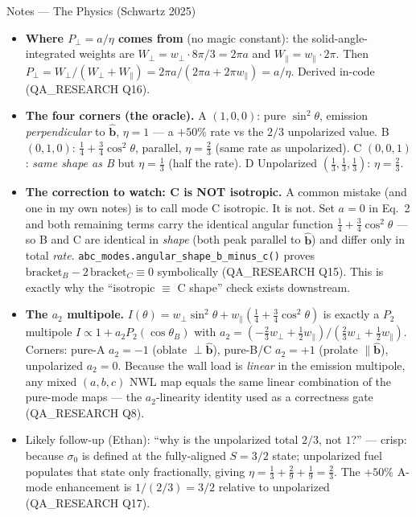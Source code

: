 \documentclass[11pt,aspectratio=169]{beamer}
\newcommand{\bhat}{\hat{\mathbf{b}}}
\begin{document}
\begin{frame}[allowframebreaks]{Notes --- The Physics (Schwartz 2025)}
{\begin{itemize}
      depends only on $(w_\perp,w_\parallel)$, through the selection probability
      $P_\perp = a/\eta$; the overall rate $\eta$ is a separate scalar that multiplies the spatial
      source strength. So A-mode and C-mode emit different \emph{numbers} of neutrons but each
      emits correctly \emph{shaped} directions. This mirrors how Schwartz himself separates angular
      factors from rate factors (QA\_RESEARCH Q18).
\item \textbf{Where $P_\perp=a/\eta$ comes from} (no magic constant): the solid-angle-integrated
      weights are $W_\perp = w_\perp\cdot 8\pi/3 = 2\pi a$ and $W_\parallel = w_\parallel\cdot
      2\pi$. Then $P_\perp = W_\perp/(W_\perp+W_\parallel) = 2\pi a/(2\pi a + 2\pi w_\parallel)
      = a/\eta$. Derived in-code (QA\_RESEARCH Q16).
\item \textbf{The four corners (the oracle).} A $(1,0,0)$: pure $\sin^2\theta$, emission
      \emph{perpendicular} to $\bhat$, $\eta=1$ --- a $+50\%$ rate vs the $2/3$ unpolarized value.
      B $(0,1,0)$: $\tfrac14+\tfrac34\cos^2\theta$, parallel, $\eta=\tfrac23$ (same rate as
      unpolarized). C $(0,0,1)$: \emph{same shape as B} but $\eta=\tfrac13$ (half the rate). D
      Unpolarized $(\tfrac13,\tfrac13,\tfrac13)$: $\eta=\tfrac23$.
\item \textbf{The correction to watch: C is NOT isotropic.} A common mistake (and one in my own
      notes) is to call mode C isotropic. It is not. Set $a=0$ in Eq.\ 2 and both remaining terms
      carry the identical angular function $\tfrac14+\tfrac34\cos^2\theta$ --- so B and C are
      identical in \emph{shape} (both peak parallel to $\bhat$) and differ only in total \emph{rate}.
      \texttt{abc\_modes.angular\_shape\_b\_minus\_c()} proves $\text{bracket}_B - 2\,
      \text{bracket}_C \equiv 0$ symbolically (QA\_RESEARCH Q15). This is exactly why the ``isotropic
      $\equiv$ C shape'' check exists downstream.
\item \textbf{The $a_2$ multipole.} $I(\theta)=w_\perp\sin^2\theta + w_\parallel(\tfrac14+
      \tfrac34\cos^2\theta)$ is exactly a $P_2$ multipole $I\propto 1 + a_2 P_2(\cos\theta_B)$ with
      $a_2 = (-\tfrac23 w_\perp + \tfrac12 w_\parallel)/(\tfrac23 w_\perp + \tfrac12 w_\parallel)$.
      Corners: pure-A $a_2=-1$ (oblate $\perp\bhat$), pure-B/C $a_2=+1$ (prolate $\parallel\bhat$),
      unpolarized $a_2=0$. Because the wall load is \emph{linear} in the emission multipole, any
      mixed $(a,b,c)$ NWL map equals the same linear combination of the pure-mode maps --- the
      $a_2$-linearity identity used as a correctness gate (QA\_RESEARCH Q8).
\item Likely follow-up (Ethan): ``why is the unpolarized total $2/3$, not $1$?'' --- crisp: because
      $\sigma_0$ is defined at the fully-aligned $S=3/2$ state; unpolarized fuel populates that
      state only fractionally, giving $\eta=\tfrac13+\tfrac29+\tfrac19=\tfrac23$. The $+50\%$
      A-mode enhancement is $1/(2/3)=3/2$ relative to unpolarized (QA\_RESEARCH Q17).
\end{itemize}
}
\end{frame}
\end{document}
